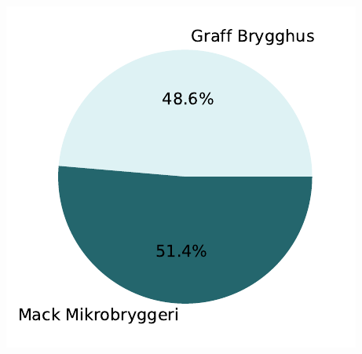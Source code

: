 \documentclass[
  12pt,
  a4paper,
  DIV=11,
  numbers=noendperiod]{scrartcl}
\begin{document}
\includegraphics{18_SOK2030_mappeoppgave_2_V24_files/figure-pdf/cell-38-output-1.pdf}
\end{document}
